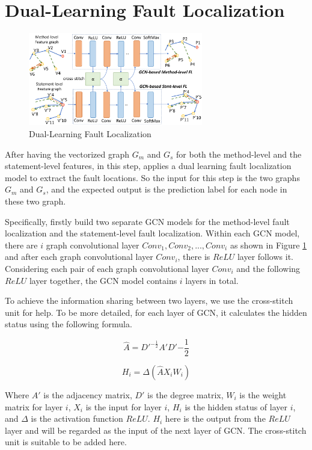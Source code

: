\section{Dual-Learning Fault Localization}

\begin{figure}[t]
	\centering
	\includegraphics[width=3in]{graphs/dual-learning.png}
	\caption{Dual-Learning Fault Localization}
	\label{dual-learning}
\end{figure}


After having the vectorized graph $G_m$ and $G_s$ for both the method-level and the statement-level features, in this step, \tool applies a dual learning fault localization model to extract the fault locations. So the input for this step is the two graphs $G_m$ and $G_s$, and the expected output is the prediction label for each node in these two graph.

Specifically, \tool firstly build two separate GCN models \cite{kipf2016semi} for the method-level fault localization and the statement-level fault localization. Within each GCN model, there are $i$ graph convolutional layer $Conv_1, Conv_2, ..., Conv_i$ as shown in Figure \ref{dual-learning} and after each graph convolutional layer $Conv_i$, there is $ReLU$ layer follows it. Considering each pair of each graph convolutional layer $Conv_i$ and the following $ReLU$ layer together, the GCN model contains $i$ layers in total. 

To achieve the information sharing between two layers, we use the cross-stitch unit \cite{misra2016cross} for help. To be more detailed, for each layer of GCN, it calculates the hidden status using the following formula.

\begin{equation}\label{eq:1}
	\hat{A} = D'^{-\frac{1}{2}}A'D'{-\frac{1}{2}}
\end{equation}

\begin{equation}\label{eq:2}
	H_i = \Delta(\hat{A}X_iW_i)
\end{equation}

Where $A'$ is the adjacency matrix, $D'$ is the degree matrix, $W_i$ is the weight matrix for layer $i$, $X_i$ is the input for layer $i$, $H_i$ is the hidden status of layer $i$, and $\Delta$ is the activation function $ReLU$. $H_i$ here is the output from the $ReLU$ layer and will be regarded as the input of the next layer of GCN. The cross-stitch unit is suitable to be added here.

